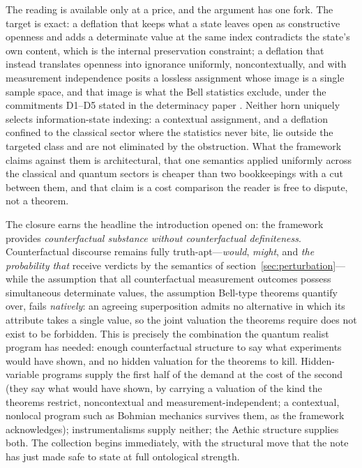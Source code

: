 \documentclass[11pt]{article}
\theoremstyle{definition}
\begin{document}
The reading is available only at a price, and the argument has one fork. The target is exact: a deflation that keeps what a state leaves open as constructive openness and adds a determinate value at the same index contradicts the state's own content, which is the internal preservation constraint; a deflation that instead translates openness into ignorance uniformly, noncontextually, and with measurement independence posits a lossless assignment whose image is a single sample space, and that image is what the Bell statistics exclude, under the commitments D1--D5 stated in the determinacy paper \cite{AethusRealist}. Neither horn uniquely selects information-state indexing: a contextual assignment, and a deflation confined to the classical sector where the statistics never bite, lie outside the targeted class and are not eliminated by the obstruction. What the framework claims against them is architectural, that one semantics applied uniformly across the classical and quantum sectors is cheaper than two bookkeepings with a cut between them, and that claim is a cost comparison the reader is free to dispute, not a theorem.



The closure earns the headline the introduction opened on: the framework provides \emph{counterfactual substance without counterfactual definiteness}. Counterfactual discourse remains fully truth-apt---\emph{would}, \emph{might}, and \emph{the probability that} receive verdicts by the semantics of section~\ref{sec:perturbation}---while the assumption that all counterfactual measurement outcomes possess simultaneous determinate values, the assumption Bell-type theorems quantify over, fails \emph{natively}: an agreeing superposition admits no alternative in which its attribute takes a single value, so the joint valuation the theorems require does not exist to be forbidden. This is precisely the combination the quantum realist program has needed: enough counterfactual structure to say what experiments would have shown, and no hidden valuation for the theorems to kill. Hidden-variable programs supply the first half of the demand at the cost of the second (they say what would have shown, by carrying a valuation of the kind the theorems restrict, noncontextual and measurement-independent; a contextual, nonlocal program such as Bohmian mechanics survives them, as the framework acknowledges); instrumentalisms supply neither; the Aethic structure supplies both. The collection begins immediately, with the structural move that the note has just made safe to state at full ontological strength.
\end{document}
